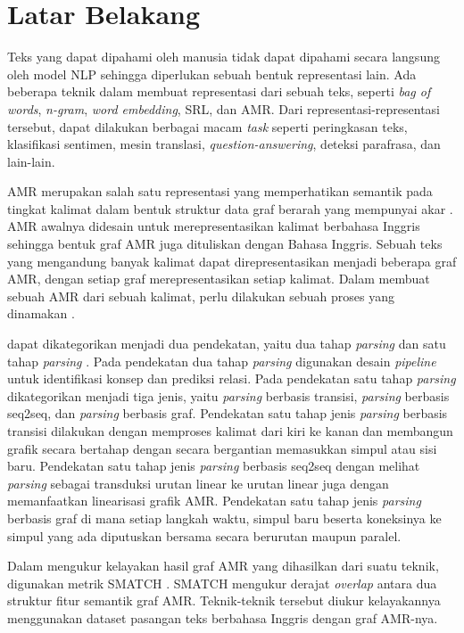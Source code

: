 \section{Latar Belakang}

Teks yang dapat dipahami oleh manusia tidak dapat dipahami secara langsung oleh model \gls{NLP} sehingga diperlukan sebuah bentuk representasi lain.
Ada beberapa teknik dalam membuat representasi dari sebuah teks, seperti \textit{bag of words}, \textit{n-gram}, \textit{word embedding}, \gls{SRL}, dan \gls{AMR}.
Dari representasi-representasi tersebut, dapat dilakukan berbagai macam \textit{task} seperti peringkasan teks, klasifikasi sentimen, mesin translasi, \textit{question-answering}, deteksi parafrasa, dan lain-lain.

\gls{AMR} merupakan salah satu representasi yang memperhatikan semantik pada tingkat kalimat dalam bentuk struktur data graf berarah yang mempunyai akar .
\gls{AMR} awalnya didesain untuk merepresentasikan kalimat berbahasa Inggris sehingga bentuk graf \gls{AMR} juga dituliskan dengan Bahasa Inggris.
Sebuah teks yang mengandung banyak kalimat dapat direpresentasikan menjadi beberapa graf \gls{AMR}, dengan setiap graf merepresentasikan setiap kalimat.
Dalam membuat sebuah \gls{AMR} dari sebuah kalimat, perlu dilakukan sebuah proses yang dinamakan \amrparsing{}.

\amrparsing{} dapat dikategorikan menjadi dua pendekatan, yaitu dua tahap \textit{parsing} dan satu tahap \textit{parsing} .
Pada pendekatan dua tahap \textit{parsing} digunakan desain \textit{pipeline} untuk identifikasi konsep dan prediksi relasi.
Pada pendekatan satu tahap \textit{parsing} dikategorikan menjadi tiga jenis, yaitu \textit{parsing} berbasis transisi, \textit{parsing} berbasis \gls{seq2seq}, dan \textit{parsing} berbasis graf.
Pendekatan satu tahap jenis \textit{parsing} berbasis transisi dilakukan dengan memproses kalimat dari kiri ke kanan dan membangun grafik secara bertahap dengan secara bergantian memasukkan simpul atau sisi baru.
Pendekatan satu tahap jenis \textit{parsing} berbasis \gls{seq2seq} dengan melihat \textit{parsing} sebagai transduksi urutan linear ke urutan linear juga dengan memanfaatkan linearisasi grafik AMR.
Pendekatan satu tahap jenis \textit{parsing} berbasis graf di mana setiap langkah waktu, simpul baru beserta koneksinya ke simpul yang ada diputuskan bersama secara berurutan maupun paralel.

Dalam mengukur kelayakan hasil graf \gls{AMR} yang dihasilkan dari suatu teknik, digunakan metrik \gls{SMATCH} .
SMATCH mengukur derajat \textit{overlap} antara dua struktur fitur semantik graf \gls{AMR}.
Teknik-teknik \amrparsing{} tersebut diukur kelayakannya menggunakan dataset pasangan teks berbahasa Inggris dengan graf AMR-nya.

